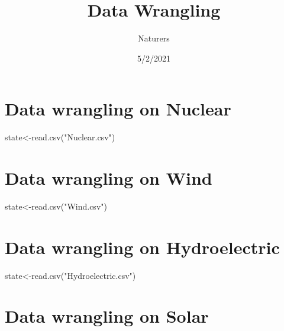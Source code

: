 \documentclass[
]{article}
\title{Data Wrangling}
\author{Naturers}
\date{5/2/2021}
\newenvironment{Shaded}{\begin{snugshade}}{\end{snugshade}}
\newcommand{\FunctionTok}[1]{\textcolor[rgb]{0.00,0.00,0.00}{#1}}
\newcommand{\NormalTok}[1]{#1}
\newcommand{\OtherTok}[1]{\textcolor[rgb]{0.56,0.35,0.01}{#1}}
\newcommand{\StringTok}[1]{\textcolor[rgb]{0.31,0.60,0.02}{#1}}
\begin{document}
\maketitle

\hypertarget{data-wrangling-on-nuclear}{%
\section{Data wrangling on Nuclear}\label{data-wrangling-on-nuclear}}

\begin{Shaded}
\begin{Highlighting}[]
\NormalTok{state}\OtherTok{\textless{}{-}}\FunctionTok{read.csv}\NormalTok{(}\StringTok{"Nuclear.csv"}\NormalTok{)}
\end{Highlighting}
\end{Shaded}

\hypertarget{data-wrangling-on-wind}{%
\section{Data wrangling on Wind}\label{data-wrangling-on-wind}}

\begin{Shaded}
\begin{Highlighting}[]
\NormalTok{state}\OtherTok{\textless{}{-}}\FunctionTok{read.csv}\NormalTok{(}\StringTok{"Wind.csv"}\NormalTok{)}
\end{Highlighting}
\end{Shaded}

\hypertarget{data-wrangling-on-hydroelectric}{%
\section{Data wrangling on
Hydroelectric}\label{data-wrangling-on-hydroelectric}}

\begin{Shaded}
\begin{Highlighting}[]
\NormalTok{state}\OtherTok{\textless{}{-}}\FunctionTok{read.csv}\NormalTok{(}\StringTok{"Hydroelectric.csv"}\NormalTok{)}
\end{Highlighting}
\end{Shaded}

\hypertarget{data-wrangling-on-solar}{%
\section{Data wrangling on Solar}\label{data-wrangling-on-solar}}
\end{document}
